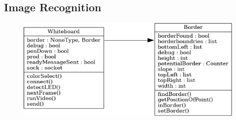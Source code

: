 \documentclass[12pt]{article}
\begin{document}
\subsection{Image Recognition}
\begin{figure}[ht!]
\centering
\includegraphics[scale=.5]{classdiagram.png}
\end{figure}


\end{document}
